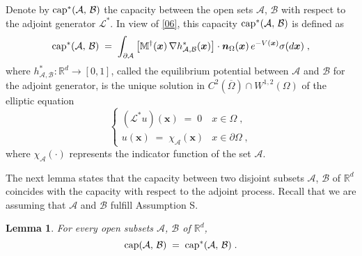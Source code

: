 \documentclass[reqno]{amsart}
\newtheorem{lemma}[theorem]{Lemma}
\newcounter{as}[section]
\newcommand{\mc}[1]{{\mathcal #1}}
\newcommand{\bb}[1]{{\mathbb #1}}
\newcommand{\bs}[1]{{\boldsymbol #1}}
\newcommand{\<}{\langle}
\renewcommand{\>}{\rangle}
\renewcommand{\Cap}{{\rm cap}}
\begin{document}
Denote by $\Cap^*(\mc A,\,\mc B)$ the capacity between the open sets
$\mc A$, $\mc B$ with respect to the adjoint generator $\mathcal
L^*$. In view of \eqref{06}, this capacity $\Cap^*(\mc A,\,\mc B)$ is
defined as
\begin{equation}
\label{10}
\Cap^* (\mc A,\,\mc B) \;=\; \int_{\partial \mc A} \big[
\bb M^\dagger(\bs{x}) \, \nabla
h^*_{\mc A,\mc B}(\bs{x}) \big] \cdot \bs n_{\Omega}(\bs{x})
\, e^{-V(\bs{x})} \sigma(d\bs{x})\;,
\end{equation}
where $h^*_{\mc A,\mc B}\colon \bb R^d \to [0,1]$, called the equilibrium
potential between $\mc A$ and $\mc B$ for the adjoint generator, is
the unique solution in $C^2(\overline{\Omega})\cap W^{1,2}(\Omega)$ of
the elliptic equation
\begin{equation*}
\begin{cases}
(\mathcal L^* u) (\bs{x}) \;=\; 0 &  x\in \Omega \;, \\
u (\bs{x}) \;=\; \chi_\mc A (\bs{x})  &   x\in \partial \Omega \;,
\end{cases}
\end{equation*}
where $\chi_\mc A(\cdot)$ represents the indicator function of the set
$\mc A$.

The next lemma states that the capacity between two disjoint subsets
$\mc A$, $\mc B$ of $\bb R^d$ coincides with the capacity with respect
to the adjoint process. Recall that we are assuming that $\mc A$ and
$\mc B$ fulfill Assumption S.

\begin{lemma}
\label{lem2}
For every open subsets $\mc A$, $\mc B$ of $\bb R^d$,
\begin{equation*}
\Cap (\mc A,\,\mc B) \;=\; \Cap^* (\mc A,\,\mc B) \;.
\end{equation*}
\end{lemma}
\end{document}
